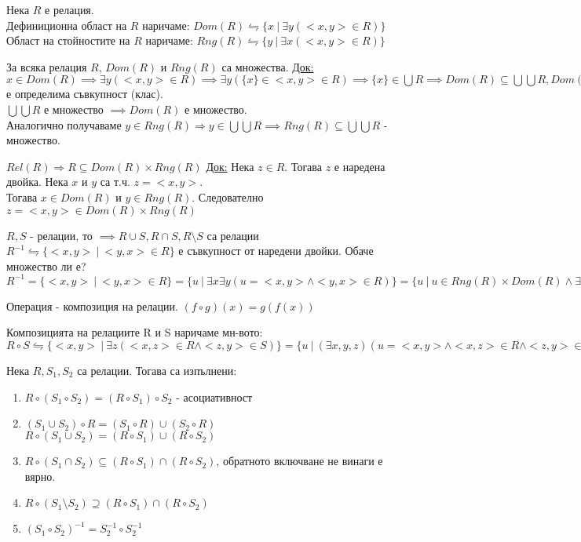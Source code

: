\documentclass[fleqn, titlepage, 12pt]{report}
\begin{document}
 Нека $R$ е релация.\\
Дефиниционна област на $R$ наричаме: $Dom(R) \leftrightharpoons \{x\ |\ \exists{y}(<x,y> \in R)\}$\\
Област на стойностите на $R$ наричаме: $Rng(R) \leftrightharpoons \{y\ |\ \exists{x}(<x,y> \in R)\}$
\bigbreak

 За всяка релация $R$, $Dom(R)$ и $Rng(R)$ са множества.
\bigbreak
\underline{Док:} $x \in Dom(R) \implies \exists{y}(<x,y> \in R) \implies \exists{y}( \{ x\} \in <x,y> \in R)
\implies \{ x\} \in \bigcup R \implies Dom(R) \subseteq \bigcup \bigcup R, Dom(R)$ е определима съвкупност (клас).\\
$\bigcup \bigcup R$ е множество $ \implies Dom(R)$ е множество.\\
Аналогично получаваме
$y \in Rng(R) \Rightarrow y \in \bigcup \bigcup R \implies Rng(R) \subseteq \bigcup \bigcup R$ - множество.
\bigbreak

 $Rel(R) \Rightarrow R \subseteq Dom(R) \times Rng(R)$
\bigbreak
\underline{Док:} Нека $z \in R$. Тогава $z$ е наредена двойка. Нека $x$ и $y$ са т.ч. $z = <x,y>$.\\
Тогава $x \in Dom(R)$ и $y \in Rng(R)$. Следователно $z = <x,y> \in Dom(R) \times Rng(R)$
\bigbreak

 $R,S$ - релации, то $\implies R \cup S, R \cap S, R \setminus S$ са релации\\
$R^{-1} \leftrightharpoons \{<x,y>\ |\ <y,x> \in R\}$ е съвкупност от наредени двойки. Обаче множество ли е?\\
$R^{-1} = \{<x,y>\ |\ <y,x> \in R\} = \{u\ |\ \exists{x}\exists{y}(u = <x,y> \land <y,x> \in R)\}
= \{u\ |\ u \in Rng(R) \times Dom(R) \land \exists{x,y}(u = <x,y> \land <y,x> \in R)\}$
\bigbreak

 Операция - композиция на релации. $(f \circ g)(x) = g(f(x))$
\bigbreak

 Композицията на релациите R и S наричаме мн-вото:\\
$R \circ S \leftrightharpoons \{<x,y>\ |\ \exists{z}(<x,z> \in R \land <z,y> \in S)\}
= \{u\ |\ (\exists{x,y,z})(u = <x,y> \land <x,z> \in R \land <z,y> \in S)\}
= \{u\ |\ u \in Dom(R) \times Rng(S) \land (\exists{x,y,z})(u = <x,y> \land <x,z> \in R \land <z,y> \in S)\}$
\bigbreak

 Нека $R, S_1, S_2$ са релации. Тогава са изпълнени:
\begin{enumerate}
  \item $R\circ (S_1\circ S_2) = (R\circ S_1)\circ S_2$ - асоциативност
  \item $(S_1 \cup S_2)\circ R = (S_1\circ R) \cup (S_2\circ R)$\\
    $R \circ (S_1 \cup S_2) = (R \circ S_1) \cup (R \circ S_2)$
  \item $R \circ (S_1 \cap S_2) \subseteq (R \circ S_1) \cap (R \circ S_2)$, обратното включване не винаги е вярно.
  \item $R \circ (S_1 \setminus S_2) \supseteq (R \circ S_1) \cap (R \circ S_2)$
  \item $(S_1 \circ S_2)^{-1} = S_2^{-1} \circ S_2^{-1}$
\end{enumerate}
\bigbreak
\end{document}
